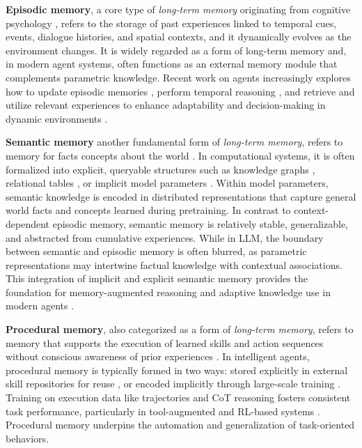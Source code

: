 \documentclass[manuscript,screen]{acmart}
\begin{document}
\textbf{Episodic memory}, a core type of \textit{long-term memory} originating from cognitive psychology \citep{tulving1972episodic}, refers to the storage of past experiences linked to temporal cues, events, dialogue histories, and spatial contexts, and it dynamically evolves as the environment changes. It is widely regarded as a form of long-term memory \citep{fountas2024human} and, in modern agent systems, often functions as an external memory module \citep{pink2025position} that complements parametric knowledge. Recent work on agents \citep{miao2024episodic} increasingly explores how to update episodic memories \citep{das2024larimar,li2024linking}, perform temporal reasoning \citep{ge2025tremu}, and retrieve and utilize relevant experiences \citep{miao2024episodic} to enhance adaptability and decision-making in dynamic environments \citep{yan2025memory}.

\textbf{Semantic memory} another fundamental form of \textit{long-term memory}, refers to memory for facts concepts about the world \citep{tulving1972episodic}. In computational systems, it is often formalized into explicit, queryable structures such as knowledge graphs \citep{rasmussen2025zep}, relational tables \citep{hu2023chatdb}, or implicit model parameters \citep{packer2023memgpt}. Within model parameters, semantic knowledge is encoded in distributed representations that capture general world facts and concepts learned during pretraining. In contrast to context-dependent episodic memory, semantic memory is relatively stable, generalizable, and abstracted from cumulative experiences. While in LLM, the boundary between semantic and episodic memory is often blurred, as parametric representations may intertwine factual knowledge with contextual associations. This integration of implicit and explicit semantic memory provides the foundation for memory-augmented reasoning and adaptive knowledge use in modern agents \citep{zhou2025mem1}.

\textbf{Procedural memory}, also categorized as a form of \textit{long-term memory}, refers to memory that supports the execution of learned skills and action sequences without conscious awareness of prior experiences \citep{fang2025memp, ouyang2025reasoningbank, zhou2025agentfly}. In intelligent agents, procedural memory is typically formed in two ways: stored explicitly in external skill repositories for reuse \citep{zhou2025agentfly}, or encoded implicitly through large-scale training \citep{liu2024deepseek}. Training on execution data like trajectories and CoT reasoning fosters consistent task performance, particularly in tool-augmented \citep{lumer2025memtool} and RL-based systems \citep{yu2025memagent}. Procedural memory underpins the automation and generalization of task-oriented behaviors. 
\end{document}
